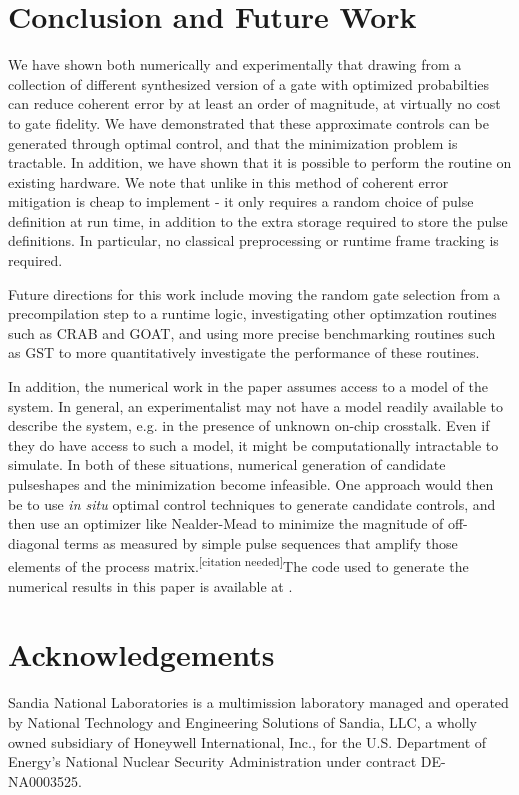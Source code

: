 \documentclass[aps,nofootinbib,pra,notitlepage,twocolumn]{revtex4-1}
\newcommand{\needcite}{{\color{blue}\textsuperscript{[citation needed]}}}
\begin{document}
\section{Conclusion and Future Work}
We have shown both numerically and experimentally that drawing from a collection of different synthesized version of a gate with  optimized probabilties can reduce coherent error by at least an order of magnitude, at virtually no cost to gate fidelity. We have demonstrated that these approximate controls can be generated through optimal control, and that the minimization problem is tractable. In addition, we have shown that it is possible to perform the routine on existing hardware. We note that unlike in \cite{Wallman2016, Campbell2017, Ware2018} this method of coherent error mitigation is cheap to implement - it only requires a random choice of pulse definition at run time, in addition to the extra storage required to store the pulse definitions. In particular, no classical preprocessing or runtime frame tracking is required.

Future directions for this work include moving the random gate selection from a precompilation step to a runtime logic, investigating other optimzation routines such as CRAB \cite{Caneva2011} and GOAT\cite{Machnes2018}, and using more precise benchmarking routines such as GST\cite{BlumeKohout2017} to more quantitatively investigate the performance of these routines.

In addition, the numerical work in the paper assumes access to a model of the system. In general, an experimentalist may not have a model readily available to describe the system, e.g. in the presence of unknown on-chip crosstalk. Even if they do have access to such a model, it might be computationally intractable to simulate. In both of these situations, numerical generation of candidate pulseshapes and the minimization become infeasible. One approach would then be to use \textit{in situ} optimal control techniques \cite{Wu2018, Kelly2014, Ferrie2015} to generate candidate controls, and then use an optimizer like Nealder-Mead to minimize the magnitude of off-diagonal terms as measured by simple pulse sequences that amplify those elements of the process matrix.\needcite The code used to generate the numerical results in this paper is available at \cite{decorrelating_errors}.

\section{Acknowledgements}
Sandia National Laboratories is a multimission laboratory managed and operated by National Technology and Engineering Solutions of Sandia, LLC, a wholly owned subsidiary of Honeywell International, Inc., for the U.S. Department of Energy's National Nuclear Security Administration under contract DE-NA0003525.

\end{document}
